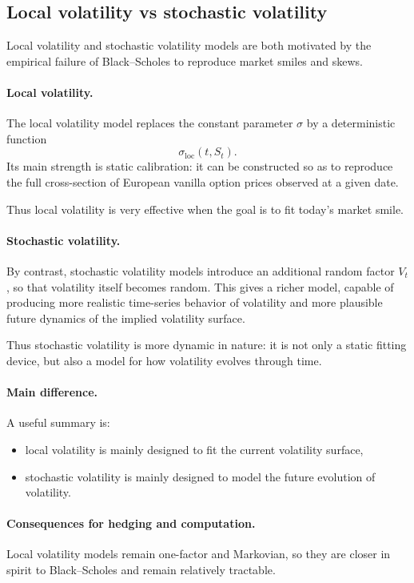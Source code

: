 \documentclass[11pt]{article}
\theoremstyle{plain}
\theoremstyle{definition}
\theoremstyle{remark}
\begin{document}
\subsection{Local volatility vs stochastic volatility}

Local volatility and stochastic volatility models are both motivated by
the empirical failure of Black--Scholes to reproduce market smiles and
skews.

\paragraph{Local volatility.}
The local volatility model replaces the constant parameter \(\sigma\) by
a deterministic function
\[
\sigma_{\mathrm{loc}}(t,S_t).
\]
Its main strength is static calibration:
it can be constructed so as to reproduce the full cross-section of
European vanilla option prices observed at a given date.

Thus local volatility is very effective when the goal is to fit today's
market smile.

\paragraph{Stochastic volatility.}
By contrast, stochastic volatility models introduce an additional random
factor \(V_t\), so that volatility itself becomes random.
This gives a richer model, capable of producing more realistic
time-series behavior of volatility and more plausible future dynamics of
the implied volatility surface.

Thus stochastic volatility is more dynamic in nature:
it is not only a static fitting device, but also a model for how
volatility evolves through time.

\paragraph{Main difference.}
A useful summary is:
\begin{itemize}[leftmargin=1.4em]
    \item local volatility is mainly designed to fit the current
    volatility surface,
    \item stochastic volatility is mainly designed to model the future
    evolution of volatility.
\end{itemize}

\paragraph{Consequences for hedging and computation.}
Local volatility models remain one-factor and Markovian, so they are
closer in spirit to Black--Scholes and remain relatively tractable.
\end{document}
